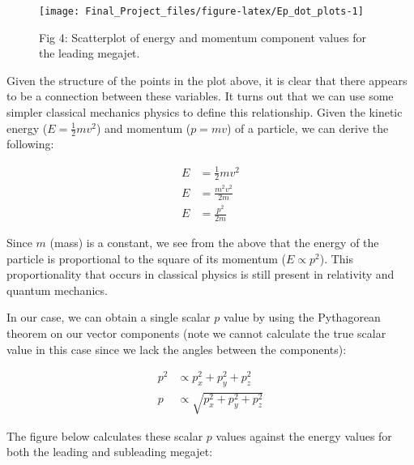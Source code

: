 \documentclass[
]{article}
\begin{document}
\begin{figure}

{\centering \texttt{[image: Final\_Project\_files/figure-latex/Ep\_dot\_plots-1]} 

}

\caption{Fig 4: Scatterplot of energy and momentum component values for the leading megajet.}\label{fig:Ep_dot_plots}
\end{figure}

Given the structure of the points in the plot above, it is clear that
there appears to be a connection between these variables. It turns out
that we can use some simpler classical mechanics physics to define this
relationship. Given the kinetic energy (\(E = \frac{1}{2}mv^2\)) and
momentum (\(p = mv\)) of a particle, we can derive the following:

\[
\begin{align}
E &= \frac{1}{2}mv^2 \\
E &= \frac{m^2v^2}{2m} \\
E &= \frac{p^2}{2m}
\end{align}
\]

Since \(m\) (mass) is a constant, we see from the above that the energy
of the particle is proportional to the square of its momentum
(\(E \propto p^2\)). This proportionality that occurs in classical
physics is still present in relativity and quantum mechanics.

In our case, we can obtain a single scalar \(p\) value by using the
Pythagorean theorem on our vector components (note we cannot calculate
the true scalar value in this case since we lack the angles between the
components):

\[
\begin{align}
p^2 &\propto p_x^2+p_y^2+p_z^2 \\
p &\propto \sqrt{p_x^2+p_y^2+p_z^2} 
\end{align}
\]

The figure below calculates these scalar \(p\) values against the energy
values for both the leading and subleading megajet:
\end{document}
